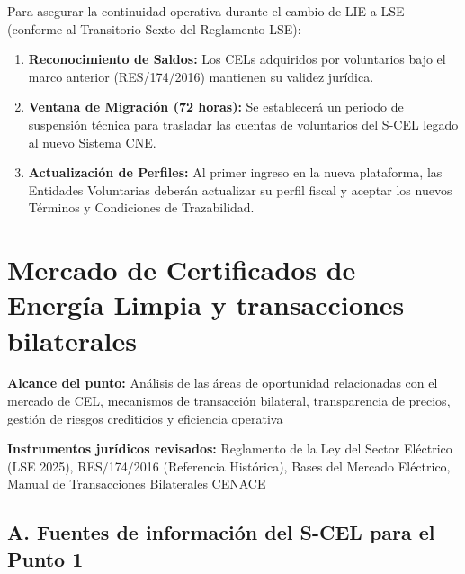 \documentclass{cel}
\begin{document}
Para asegurar la continuidad operativa durante el cambio de LIE a LSE (conforme al Transitorio Sexto del Reglamento LSE):


\begin{enumerate}
\item \textbf{Reconocimiento de Saldos:} Los CELs adquiridos por voluntarios bajo el marco anterior (RES/174/2016) mantienen su validez jurídica.
\item \textbf{Ventana de Migración (72 horas):} Se establecerá un periodo de suspensión técnica para trasladar las cuentas de voluntarios del S-CEL legado al nuevo Sistema CNE.
\item \textbf{Actualización de Perfiles:} Al primer ingreso en la nueva plataforma, las Entidades Voluntarias deberán actualizar su perfil fiscal y aceptar los nuevos Términos y Condiciones de Trazabilidad.

\end{enumerate}
\clearpage
{}
{}
\section*{Mercado de Certificados de Energía Limpia y transacciones bilaterales}
\nopagebreak

\textbf{Alcance del punto:} Análisis de las áreas de oportunidad relacionadas con el mercado de CEL, mecanismos de transacción bilateral, transparencia de precios, gestión de riesgos crediticios y eficiencia operativa

\textbf{Instrumentos jurídicos revisados:} Reglamento de la Ley del Sector Eléctrico (LSE 2025), RES/174/2016 (Referencia Histórica), Bases del Mercado Eléctrico, Manual de Transacciones Bilaterales CENACE


\vspace{0.4cm}
\subsection{A. Fuentes de información del S-CEL para el Punto 1}
\nopagebreak
\end{document}
